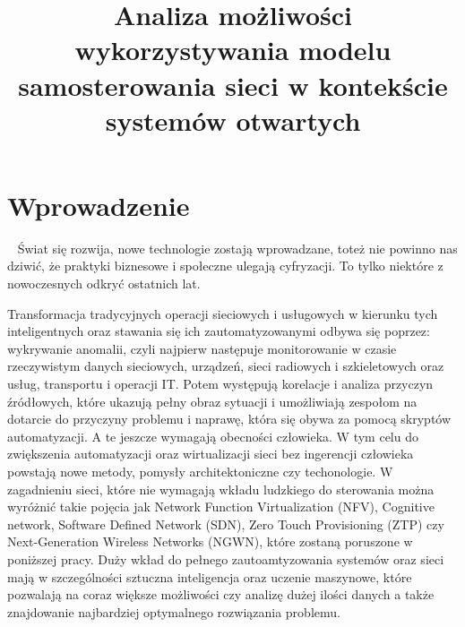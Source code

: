 \documentclass[sn-mathphys,Numbered]{sn-jnl}
\theoremstyle{thmstyleone}%
\theoremstyle{thmstyletwo}%
\theoremstyle{thmstylethree}%
\begin{document}
\title[Article Title]{Analiza możliwości wykorzystywania modelu samosterowania sieci w kontekście systemów otwartych}



\author[]{ \sur{}}
\author[]{ \sur{}}




\maketitle

\section{Wprowadzenie}
~   Świat się rozwija, nowe technologie zostają wprowadzane, toteż nie powinno nas dziwić, że praktyki biznesowe i społeczne ulegają cyfryzacji\cite{noauthor_zero_nodate}. To tylko niektóre z nowoczesnych odkryć ostatnich lat.  

Transformacja tradycyjnych operacji sieciowych i usługowych w kierunku tych inteligentnych oraz stawania się ich zautomatyzowanymi odbywa się poprzez: wykrywanie anomalii, czyli najpierw następuje monitorowanie w czasie rzeczywistym danych sieciowych, urządzeń, sieci radiowych i szkieletowych oraz usług, transportu i operacji IT. Potem występują korelacje i analiza przyczyn źródłowych, które ukazują pełny obraz sytuacji i umożliwiają zespołom na dotarcie do przyczyny problemu i naprawę, która się obywa za pomocą skryptów automatyzacji. A te jeszcze wymagają obecności człowieka\cite{noauthor_what_nodate}. W tym celu do zwiększenia automatyzacji oraz wirtualizacji sieci bez ingerencji człowieka powstają nowe metody, pomysły architektoniczne czy techonologie. W zagadnieniu sieci, które nie wymagają wkładu ludzkiego do sterowania można wyróżnić takie pojęcia jak Network Function Virtualization (NFV), Cognitive network, Software Defined Network (SDN), Zero Touch Provisioning (ZTP) czy Next-Generation Wireless Networks (NGWN), które zostaną poruszone w poniższej pracy. Duży wkład do pełnego zautoamtyzowania systemów oraz sieci mają w szczególności sztuczna inteligencja oraz uczenie maszynowe, które pozwalają na coraz większe możliwości czy analizę dużej ilości danych a także znajdowanie najbardziej optymalnego rozwiązania problemu.
\end{document}
